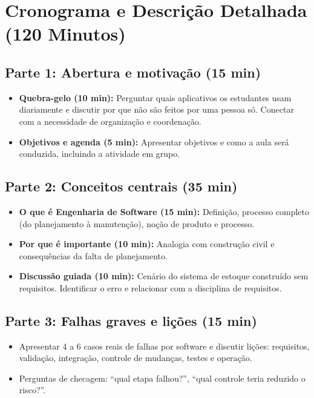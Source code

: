 \documentclass[12pt,a4paper]{article}
\begin{document}
\section{Cronograma e Descrição Detalhada (120 Minutos)}
\subsection*{Parte 1: Abertura e motivação (15 min)}
\begin{itemize}[leftmargin=*,itemsep=0.35em]
  \item \textbf{Quebra-gelo (10 min):} Perguntar quais aplicativos os estudantes usam diariamente e discutir por que não são feitos por uma pessoa só. Conectar com a necessidade de organização e coordenação.
  \item \textbf{Objetivos e agenda (5 min):} Apresentar objetivos e como a aula será conduzida, incluindo a atividade em grupo.
\end{itemize}

\subsection*{Parte 2: Conceitos centrais (35 min)}
\begin{itemize}[leftmargin=*,itemsep=0.35em]
  \item \textbf{O que é Engenharia de Software (15 min):} Definição, processo completo (do planejamento à manutenção), noção de produto e processo.
  \item \textbf{Por que é importante (10 min):} Analogia com construção civil e consequências da falta de planejamento.
  \item \textbf{Discussão guiada (10 min):} Cenário do sistema de estoque construído sem requisitos. Identificar o erro e relacionar com a disciplina de requisitos.
\end{itemize}

\subsection*{Parte 3: Falhas graves e lições (15 min)}
\begin{itemize}[leftmargin=*,itemsep=0.35em]
  \item Apresentar 4 a 6 casos reais de falhas por software e discutir lições: requisitos, validação, integração, controle de mudanças, testes e operação.
  \item Perguntas de checagem: ``qual etapa falhou?'', ``qual controle teria reduzido o risco?''.
\end{itemize}
\end{document}
